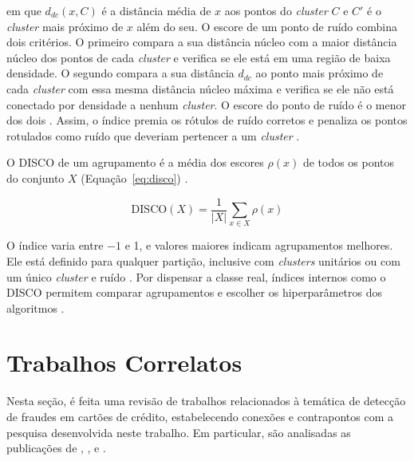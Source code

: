 \documentclass{uflamon}          %
\begin{document}
em que $d_{dc}(x, C)$ é a distância média de $x$ aos pontos do \textit{cluster} $C$ e $C'$ é o \textit{cluster} mais próximo de $x$ além do seu. O escore de um ponto de ruído combina dois critérios. O primeiro compara a sua distância núcleo com a maior distância núcleo dos pontos de cada \textit{cluster} e verifica se ele está em uma região de baixa densidade. O segundo compara a sua distância $d_{dc}$ ao ponto mais próximo de cada \textit{cluster} com essa mesma distância núcleo máxima e verifica se ele não está conectado por densidade a nenhum \textit{cluster}. O escore do ponto de ruído é o menor dos dois \cite{beer2025}. Assim, o índice premia os rótulos de ruído corretos e penaliza os pontos rotulados como ruído que deveriam pertencer a um \textit{cluster} \cite{beer2025}.

O DISCO de um agrupamento é a média dos escores $\rho(x)$ de todos os pontos do conjunto $X$ (Equação~\ref{eq:disco}) \cite{beer2025}.

\begin{equation}
    \mathrm{DISCO}(X) = \frac{1}{|X|} \sum_{x \in X} \rho(x)
    \label{eq:disco}
\end{equation}

O índice varia entre $-1$ e 1, e valores maiores indicam agrupamentos melhores. Ele está definido para qualquer partição, inclusive com \textit{clusters} unitários ou com um único \textit{cluster} e ruído \cite{beer2025}. Por dispensar a classe real, índices internos como o DISCO permitem comparar agrupamentos e escolher os hiperparâmetros dos algoritmos \cite{beer2025}.


\chapter{Trabalhos Correlatos}
\label{cap:correlatos}

Nesta seção, é feita uma revisão de trabalhos relacionados à temática de detecção de fraudes em cartões de crédito, estabelecendo conexões e contrapontos com a pesquisa desenvolvida neste trabalho. Em particular, são analisadas as publicações de , ,  e .
\end{document}
